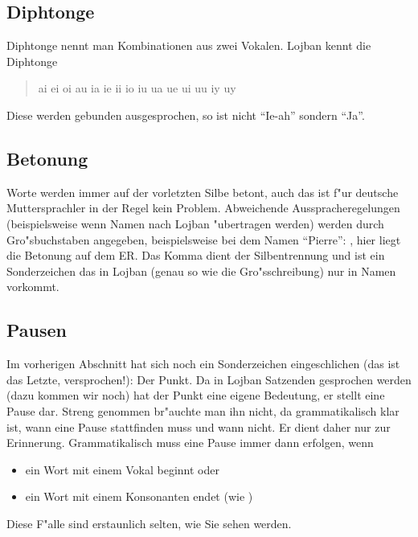 \subsection{Diphtonge}
Diphtonge nennt man Kombinationen aus zwei Vokalen. Lojban kennt die Diphtonge
\begin{quote}
ai ei oi au ia ie ii io iu ua ue ui uu iy uy
\end{quote}
Diese werden gebunden ausgesprochen, so ist  nicht ``Ie-ah'' sondern ``Ja''.

\subsection{Betonung}
Worte werden immer auf der vorletzten Silbe betont, auch das ist f"ur deutsche Muttersprachler in der Regel kein Problem. Abweichende
Ausspracheregelungen (beispielsweise wenn Namen nach Lojban "ubertragen werden) werden durch Gro"sbuchstaben angegeben,
beispielsweise bei dem Namen ``Pierre'': , hier liegt die Betonung auf dem ER. Das Komma dient der Silbentrennung und ist
ein Sonderzeichen das in Lojban (genau so wie die Gro"sschreibung) nur in Namen vorkommt.

\subsection{Pausen}
Im vorherigen Abschnitt hat sich noch ein Sonderzeichen eingeschlichen (das ist das Letzte, versprochen!): Der Punkt. Da in Lojban
Satzenden gesprochen werden (dazu kommen wir noch) hat der Punkt eine eigene Bedeutung, er stellt eine Pause dar. Streng genommen
br"auchte man ihn nicht, da grammatikalisch klar ist, wann eine Pause stattfinden muss und wann nicht. Er dient daher nur zur Erinnerung.
Grammatikalisch muss eine Pause immer dann erfolgen, wenn
\begin{itemize}
\item ein Wort mit einem Vokal beginnt oder
\item ein Wort mit einem Konsonanten endet (wie )
\end{itemize}
Diese F"alle sind erstaunlich selten, wie Sie sehen werden.

